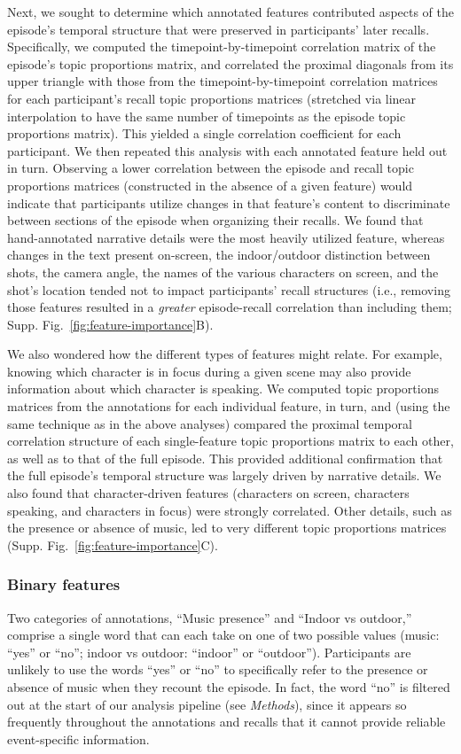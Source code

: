 \documentclass{article}
\begin{document}
Next, we sought to determine which annotated features contributed aspects of the episode's temporal structure that were preserved in participants' later recalls.  Specifically, we computed the timepoint-by-timepoint correlation matrix of the episode's topic proportions matrix, and correlated the proximal diagonals from its upper triangle with those from the timepoint-by-timepoint correlation matrices for each participant's recall topic proportions matrices (stretched via linear interpolation to have the same number of timepoints as the episode topic proportions matrix).  This yielded a single correlation coefficient for each participant.  We then repeated this analysis with each annotated feature held out in turn.  Observing a lower correlation between the episode and recall topic proportions matrices (constructed in the absence of a given feature) would indicate that participants utilize changes in that feature's content to discriminate between sections of the episode when organizing their recalls.  We found that hand-annotated narrative details were the most heavily utilized feature, whereas changes in the text present on-screen, the indoor/outdoor distinction between shots, the camera angle, the names of the various characters on screen, and the shot's location tended not to impact participants' recall structures (i.e., removing those features resulted in a \textit{greater} episode-recall correlation than including them; Supp. Fig.~\ref{fig:feature-importance}B).

We also wondered how the different types of features might relate.  For example, knowing which character is in focus during a given scene may also provide information about which character is speaking.  We computed topic proportions matrices from the annotations for each individual feature, in turn, and (using the same technique as in the above analyses) compared the proximal temporal correlation structure of each single-feature topic proportions matrix to each other, as well as to that of the full episode.  This provided additional confirmation that the full episode's temporal structure was largely driven by narrative details.  We also found that character-driven features (characters on screen, characters speaking, and characters in focus) were strongly correlated.  Other details, such as the presence or absence of music, led to very different topic proportions matrices (Supp. Fig.~\ref{fig:feature-importance}C).

\subsubsection*{Binary features}
Two categories of annotations, ``Music presence'' and ``Indoor vs outdoor,'' comprise a single word that can each take on one of two possible values (music: ``yes'' or ``no''; indoor vs outdoor: ``indoor'' or ``outdoor'').  Participants are unlikely to use the words ``yes'' or ``no'' to specifically refer to the presence or absence of music when they recount the episode.  In fact, the word ``no'' is filtered out at the start of our analysis pipeline (see \textit{Methods}), since it appears so frequently throughout the annotations and recalls that it cannot provide reliable event-specific information.
\end{document}
